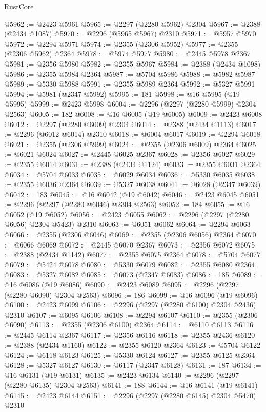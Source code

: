 \begin{lexlean}{RustCore}
\begin{coremodule}
@5962 := @2423 @5961
@5965 := @2297 (@2280 @5962) @2304
@5967 := @2388 (@2434 @1087)
@5970 := @2296 (@5965 @5967) @2310
@5971 := @5957 @5970
@5972 := @2294 @5971
@5974 := @2355 (@2306 @5952)
@5977 := @2355 (@2306 @5962) @2364
@5978 := @5974 @5977
@5980 := @2445 @5978 @2367
@5981 := @2356 @5980
@5982 := @2355 @5967
@5984 := @2388 (@2434 @1098)
@5986 := @2355 @5984 @2364
@5987 := @5704 @5986
@5988 := @5982 @5987
@5989 := @5330 @5988
@5991 := @2355 @5989 @2364
@5992 := @5327 @5991
@5994 := @5981 (@2347 @5992)
@5995 := 181
@5998 := @16 @5995 (@19 @5995)
@5999 := @2423 @5998
@6004 := @2296 (@2297 (@2280 @5999) @2304 @2563)
@6005 := 182
@6008 := @16 @6005 (@19 @6005)
@6009 := @2423 @6008
@6012 := @2297 (@2280 @6009) @2304
@6014 := @2388 (@2434 @1113)
@6017 := @2296 (@6012 @6014) @2310
@6018 := @6004 @6017
@6019 := @2294 @6018
@6021 := @2355 (@2306 @5999)
@6024 := @2355 (@2306 @6009) @2364
@6025 := @6021 @6024
@6027 := @2445 @6025 @2367
@6028 := @2356 @6027
@6029 := @2355 @6014
@6031 := @2388 (@2434 @1124)
@6033 := @2355 @6031 @2364
@6034 := @5704 @6033
@6035 := @6029 @6034
@6036 := @5330 @6035
@6038 := @2355 @6036 @2364
@6039 := @5327 @6038
@6041 := @6028 (@2347 @6039)
@6042 := 183
@6045 := @16 @6042 (@19 @6042)
@6046 := @2423 @6045
@6051 := @2296 (@2297 (@2280 @6046) @2304 @2563)
@6052 := 184
@6055 := @16 @6052 (@19 @6052)
@6056 := @2423 @6055
@6062 := @2296 (@2297 (@2280 @6056) @2304 @5423) @2310
@6063 := @6051 @6062
@6064 := @2294 @6063
@6066 := @2355 (@2306 @6046)
@6069 := @2355 (@2306 @6056) @2364
@6070 := @6066 @6069
@6072 := @2445 @6070 @2367
@6073 := @2356 @6072
@6075 := @2388 (@2434 @1142)
@6077 := @2355 @6075 @2364
@6078 := @5704 @6077
@6079 := @5424 @6078
@6080 := @5330 @6079
@6082 := @2355 @6080 @2364
@6083 := @5327 @6082
@6085 := @6073 (@2347 @6083)
@6086 := 185
@6089 := @16 @6086 (@19 @6086)
@6090 := @2423 @6089
@6095 := @2296 (@2297 (@2280 @6090) @2304 @2563)
@6096 := 186
@6099 := @16 @6096 (@19 @6096)
@6100 := @2423 @6099
@6106 := @2296 (@2297 (@2280 @6100) @2304 @2436) @2310
@6107 := @6095 @6106
@6108 := @2294 @6107
@6110 := @2355 (@2306 @6090)
@6113 := @2355 (@2306 @6100) @2364
@6114 := @6110 @6113
@6116 := @2445 @6114 @2367
@6117 := @2356 @6116
@6118 := @2355 @2436
@6120 := @2388 (@2434 @1160)
@6122 := @2355 @6120 @2364
@6123 := @5704 @6122
@6124 := @6118 @6123
@6125 := @5330 @6124
@6127 := @2355 @6125 @2364
@6128 := @5327 @6127
@6130 := @6117 (@2347 @6128)
@6131 := 187
@6134 := @16 @6131 (@19 @6131)
@6135 := @2423 @6134
@6140 := @2296 (@2297 (@2280 @6135) @2304 @2563)
@6141 := 188
@6144 := @16 @6141 (@19 @6141)
@6145 := @2423 @6144
@6151 := @2296 (@2297 (@2280 @6145) @2304 @5470) @2310

\end{coremodule}
\end{lexlean}
